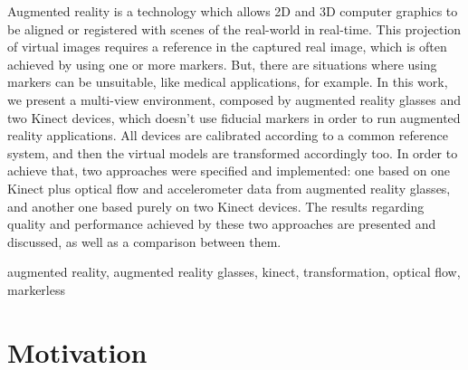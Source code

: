 \documentclass[msc, a4paper, classic, en]{ufbathesis}
\begin{document}
\abstract
Augmented reality is a technology which allows 2D and 3D computer graphics to be aligned or registered with scenes of the real-world in real-time. This projection of virtual images requires a reference in the captured real image, which is often achieved by using one or more markers. But, there are situations where using markers can be unsuitable, like medical applications, for example. In this work, we present a multi-view environment, composed by augmented reality glasses and two Kinect devices, which doesn't use fiducial markers in order to run augmented reality applications. All devices are calibrated according to a common reference system, and then the virtual models are transformed accordingly too. In order to achieve that, two approaches were specified and implemented: one based on one Kinect plus optical flow and accelerometer data from augmented reality glasses, and another one based purely on two Kinect devices. The results regarding quality and performance achieved by these two approaches are presented and discussed, as well as a comparison between them.
\begin{keywords}
augmented reality, augmented reality glasses, kinect, transformation, optical flow, markerless
\end{keywords}

\tableofcontents

\listoffigures

\listoftables

\mainmatter

% 
% 
% 
%

\section{Motivation}
\end{document}

